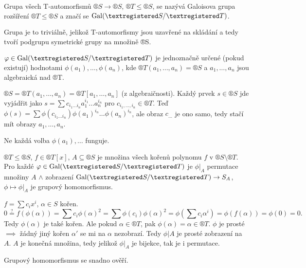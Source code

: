 \documentclass[12pt]{article}                   %
\begin{document}
        \begin{definice}
            Grupa všech T-automorfismů $®S \rightarrow ®S$, $®T ≤ ®S$, se nazývá Galoisova grupa rozšíření $®T ≤ ®S$ a značí se $\Gal(®S / ®T)$.

            \begin{dukazin}
                Grupa je to triviálně, jelikož T-automorfismy jsou uzavřené na skládání a tedy tvoří podgrupu symetrické grupy na množině ®S.
            \end{dukazin}
        \end{definice}

        \begin{pozorovani}
            $\phi \in \Gal(®S / ®T)$ je jednoznačně určené (pokud existují) hodnotami $\phi(a_1), …, \phi(a_n)$, kde $®T(a_1, …, a_n) = ®S$ a $a_1, …, a_n$ jsou algebraická nad ®T.

            \begin{dukazin}
                $®S = ®T(a_1, …, a_n) = ®T[a_1, …, a_n]$ (z algebraičnosti). Každý prvek $s \in ®S$ jde vyjádřit jako $s = \sum c_{i_1…i_n}a_1^{i_1} … a_n^{i_n}$ pro $c_{i_1, …, i_n} \in ®T$. Teď $\phi(s) = \sum\phi(c_{i_1…i_n}) \phi(a_1)^{i_n}…\phi(a_n)^{i_n}$, ale obraz $c_{…}$ je ono samo, tedy stačí mít obrazy $a_1, …, a_n$.
            \end{dukazin}
        \end{pozorovani}

        \begin{upozorneni}
            Ne každá volba $\phi(a_1), …$ funguje.
        \end{upozorneni}

        \begin{tvrzeni}
            $®T ≤ ®S$, $f \in ®T[x]$, $A \subseteq ®S$ je množina všech kořenů polynomu $f$ v $®S \setminus ®T$. Pro každé $\phi \in \Gal(®S/®T)$ je $\phi|_A$ permutace množiny $A$ $\land$ zobrazení $\Gal(®S / ®T) \rightarrow S_A$, $\phi \mapsto \phi|_A$ je grupový homomorfismus.


            \begin{dukazin}
                $f = \sum c_ix^i$, $\alpha \in S$ kořen. 
                $$ 0 \overset{?}{=} f(\phi(\alpha)) = \sum c_i \phi(\alpha)^2 = \sum \phi(c_i)\phi(\alpha)^2 = \phi(\sum c_i \alpha^i) = \phi(f(\alpha)) = \phi(0) = 0. $$
            Tedy $\phi(\alpha)$ je také kořen. Ale pokud $\alpha \in ®T$, pak $\phi(\alpha) = \alpha \in ®T$. $\phi$ je prosté $\implies$ žádný jiný kořen $\alpha'$ se mi na $\alpha$ nezobrazí. Tedy $\phi | A$ je prosté zobrazení na $A$. $A$ je konečná množina, tedy jelikož $\phi|_A$ je bijekce, tak je i permutace.

                Grupový homomorfismus se snadno ověří.
            \end{dukazin}
        \end{tvrzeni}
\end{document}

